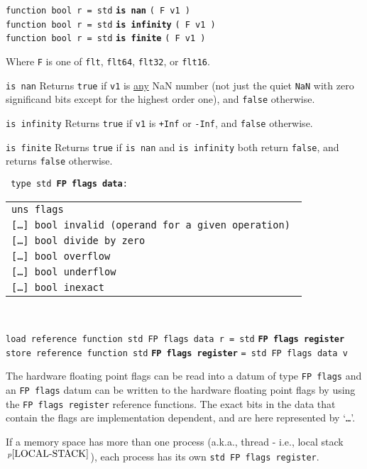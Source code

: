 \documentclass[12pt]{article}
\newcommand{\ttkey}[1]{{\tt \bfseries #1}}
\newcommand{\pagnote}[1]{$\,^{p\pageref{#1}}$}
\newenvironment{indpar}[1][0.3in]%
	{\begin{list}{}%
		     {\setlength{\itemsep}{0in}%
		      \setlength{\topsep}{0in}%
		      \setlength{\parsep}{1ex}%
		      \setlength{\labelwidth}{#1}%
		      \setlength{\leftmargin}{#1}%
		      \addtolength{\leftmargin}{\labelsep}}%
	 \item}%
	{\end{list}}
\newenvironment{itemlist}[1][1.2in]%
	{\begin{list}{}{\setlength{\labelwidth}{#1}%
		        \setlength{\leftmargin}{\labelwidth}%
		        \addtolength{\leftmargin}{+0.2in}%
		        \renewcommand{\makelabel}[1]{##1\hfill}}}%
	{\end{list}}
\begin{document}
{\tt function bool r = std} \ttkey{is nan} {\tt ( F v1 )} \\
{\tt function bool r = std} \ttkey{is infinity} {\tt ( F v1 )} \\
{\tt function bool r = std} \ttkey{is finite} {\tt ( F v1 )}
\begin{indpar}
Where {\tt F} is one of {\tt flt}, {\tt flt64}, {\tt flt32}, or {\tt flt16}.
\begin{itemlist}
\item[\tt is nan]
Returns {\tt true} if {\tt v1} is \underline{any} NaN number
(not just the quiet {\tt NaN} with zero significand bits except for
the highest order one),
and {\tt false} otherwise.
\item[\tt is infinity]
Returns {\tt true} if {\tt v1} is {\tt +Inf} or {\tt -Inf}, and {\tt false}
otherwise.
\item[\tt is finite]
Returns {\tt true} if {\tt is nan} and {\tt is infinity}
both return {\tt false}, and returns {\tt false} otherwise.
\end{itemlist}
\end{indpar}

{\tt
type~std~\ttkey{FP flags data}:\label{FP-FLAGS-DATA} \\
\begin{tabular}[t]{@{~~~~~}l}
\tt uns flags \\
\tt [\ldots] bool invalid (operand for a given operation) \\
\tt [\ldots] bool divide by zero \\
\tt [\ldots] bool overflow \\
\tt [\ldots] bool underflow \\
\tt [\ldots] bool inexact \\
\end{tabular} \\
}
{\tt load reference function std FP flags data r = std}
    \ttkey{FP flags register} \\
{\tt store reference function std}
    \ttkey{FP flags register} {\tt = std FP flags data v}
\begin{indpar}
The hardware floating point flags can be read into a datum of type
{\tt FP flags} and an {\tt FP flags} datum can be written
to the hardware floating point flags by using the {\tt FP flags register}
reference functions.  The exact bits in the data that contain the flags
are implementation dependent, and are here represented by `{\tt \ldots{}}'.

If a memory space has more than one process (a.k.a., thread - i.e., local
stack\pagnote{LOCAL-STACK}), each process has its own
{\tt std FP flags register}.
\end{indpar}
\end{document}
